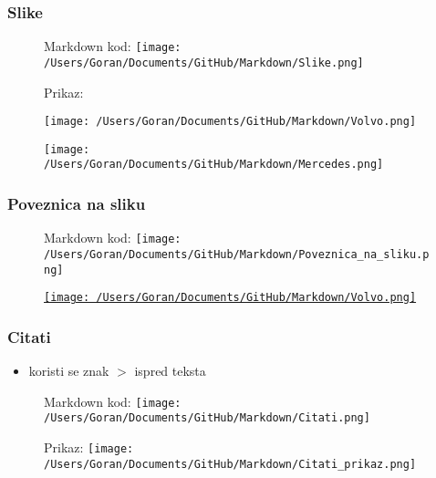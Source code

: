 \documentclass{beamer}
\begin{document}
\begin{frame}
\frametitle{Slike}
\begin{figure}
{Markdown kod:} 
\texttt{[image: /Users/Goran/Documents/GitHub/Markdown/Slike.png]}
\end{figure}

\begin{figure}
\begin{center}
{Prikaz:}
\end{center}
\begin{flushleft}
\begin{center}
\texttt{[image: /Users/Goran/Documents/GitHub/Markdown/Volvo.png]}
\end{center}
\end{flushleft}
\end{figure}

\begin{figure} 
\begin{flushleft}

\begin{center}
\texttt{[image: /Users/Goran/Documents/GitHub/Markdown/Mercedes.png]}
\end{center}
\end{flushleft}
\end{figure}

\end{frame}

\newpage

\begin{frame}
\frametitle{Poveznica na sliku}
\begin{figure}
{Markdown kod:}
\texttt{[image: /Users/Goran/Documents/GitHub/Markdown/Poveznica\_na\_sliku.png]}
\end{figure}

\begin{figure}
\href{https://www.volvocars.com/hr}{\texttt{[image: /Users/Goran/Documents/GitHub/Markdown/Volvo.png]}}
\end{figure}
\end{frame}

\newpage

\begin{frame}
\frametitle{Citati}
\begin{itemize}
\item koristi se znak $>$ ispred teksta
\end{itemize}
\begin{figure}
{Markdown kod:}
\texttt{[image: /Users/Goran/Documents/GitHub/Markdown/Citati.png]}
\end{figure}

\begin{figure}
{Prikaz:}
\texttt{[image: /Users/Goran/Documents/GitHub/Markdown/Citati\_prikaz.png]}
\end{figure}
\end{frame}
\end{document}
